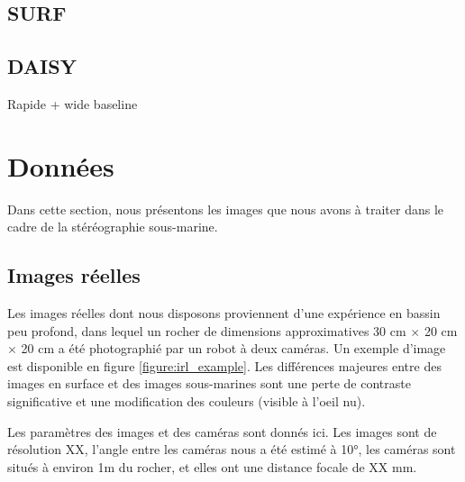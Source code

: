 \documentclass[
	a4paper, %
	10pt, %
	unnumberedsections, %
	twoside, %
]{LTJournalArticle}
\begin{document}

\subsection{SURF}

\subsection{DAISY}

Rapide + wide baseline

\section{Données}

Dans cette section, nous présentons les images que nous avons à traiter dans le cadre de la stéréographie sous-marine.

\subsection{Images réelles}

Les images réelles dont nous disposons proviennent d'une expérience en bassin peu profond, dans lequel un rocher de dimensions approximatives 30 cm $\times$ 20 cm $\times$ 20 cm a été photographié par un robot à deux caméras. Un exemple d'image est disponible en figure \ref{figure:irl_example}.
Les différences majeures entre des images en surface et des images sous-marines sont une perte de contraste significative et une modification des couleurs (visible à l'oeil nu).


Les paramètres des images et des caméras sont donnés ici.
Les images sont de résolution XX, l'angle entre les caméras nous a été estimé à 10°, les caméras sont situés à environ 1m du rocher, et elles ont une distance focale de XX mm.
\end{document}

